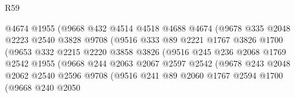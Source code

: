 \begin{lexlean}{R59}
\begin{coremodule}
                              @4674
                              @1955
                              (@9668
                                @432
                                @4514
                                @4518
                                @4688
                                @4674
                                (@9678
                                  @335
                                  @2048
                                  @2223
                                  @2540
                                  @3828
                                  @9708
                                  (@9516
                                    @333
                                    @89
                                    @2221
                                    @1767
                                    @3826
                                    @1700
                                    (@9653
                                      @332
                                      @2215
                                      @2220
                                      @3858
                                      @3826
                                      (@9516
                                        @245
                                        @236
                                        @2068
                                        @1769
                                        @2542
                                        @1955
                                        (@9668
                                          @244
                                          @2063
                                          @2067
                                          @2597
                                          @2542
                                          (@9678
                                            @243
                                            @2048
                                            @2062
                                            @2540
                                            @2596
                                            @9708
                                            (@9516
                                              @241
                                              @89
                                              @2060
                                              @1767
                                              @2594
                                              @1700
                                              (@9668
                                                @240
                                                @2050

\end{coremodule}
\end{lexlean}
